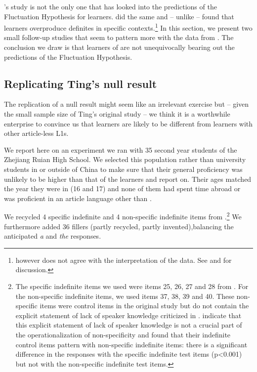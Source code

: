 \documentclass[output=paper,
modfonts
]{langscibook}
\begin{document}
\citeauthor{SnapeLeungTing2006}’s study is not the only one that has looked into the predictions of the Fluctuation Hypothesis for  learners. \citet{Trenkic2008} did the same and – unlike \citeauthor{SnapeLeungTing2006} – found that  learners overproduce definites in  specific contexts.\footnote{\citet{Trenkic2008} however does not agree with the interpretation of the data. See \citet{Trenkic2008} and \citet{IoninZubizarretaPhilippov2009} for discussion.}  In this section, we present two small follow-up studies that seem to pattern more with the data from \citet{SnapeLeungTing2006}. The conclusion we draw is that  learners of  are not unequivocally bearing out the predictions of the Fluctuation Hypothesis.

\subsection{Replicating Ting's null result}\label{sec:lebruyn:4-1}

The replication of a null result might seem like an irrelevant exercise but -- given the small sample size of Ting’s original study -- we think it is a worthwhile enterprise to convince us that  learners are likely to be different from learners with other article-less L1s.

We report here on an experiment we ran with 35 second year students of the Zhejiang Ruian High School. We selected this population rather than university students in or outside of China to make sure that their general proficiency was unlikely to be higher than that of the  learners \citet{Hawkinsetal2006} and \citet{Reidetal2006} report on. Their ages matched the year they were in (16 and 17) and none of them had spent time abroad or was proficient in an article language other than .

We recycled 4 specific indefinite and 4 non-specific indefinite items from \citet{IoninKoWexler2004}.\footnote{The specific indefinite items we used were items 25, 26, 27 and 28 from \citet{IoninKoWexler2004}. For the non-specific indefinite items, we used items 37, 38, 39 and 40. These non-specific items were control items in the original study but do not contain the explicit statement of lack of speaker knowledge criticized in \citet{Trenkic2008}. \citet{IoninZubizarretaPhilippov2009} indicate that this explicit statement of lack of speaker knowledge is not a crucial part of the operationalization of non-specificity and \citet{IoninKoWexler2004} found that their indefinite control items pattern with non-specific indefinite items: there is a significant difference in the responses with the specific indefinite test items (p<0.001) but not with the non-specific indefinite test items.}  We furthermore added 36 fillers (partly recycled, partly invented),\largerpage balancing the anticipated \textit{a} and \textit{the} responses.
\end{document}
